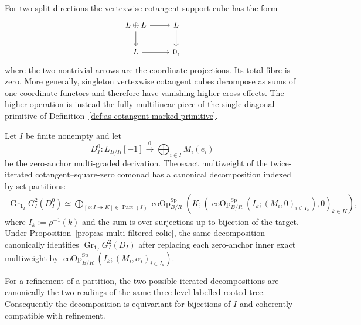 \begin{remark}
For two split directions the vertexwise cotangent support cube has the form
\[
\begin{tikzcd}
L\oplus L \arrow[r] \arrow[d] & L \arrow[d]\\
L \arrow[r] & 0,
\end{tikzcd}
\]
where the two nontrivial arrows are the coordinate projections.  Its total
fibre is zero.  More generally, singleton vertexwise cotangent cubes decompose
as sums of one-coordinate functors and therefore have vanishing higher
cross-effects.  The higher operation is instead the fully multilinear piece
of the single diagonal primitive of
Definition~\ref{def:as-cotangent-marked-primitive}.
\end{remark}

\begin{lemma}
\label{lem:as-two-level-partition-decomposition}
Let $I$ be finite nonempty and let
\[
    D_I^0:
    L_{B/R}[-1]
    \xrightarrow{0}
    \bigoplus_{i\in I}M_i(e_i)
\]
be the zero-anchor multi-graded derivation.  The exact multiweight of the
twice-iterated cotangent--square-zero comonad has a canonical decomposition
indexed by set partitions:
\[
\boxed{
\begin{aligned}
    \operatorname{Gr}_{\mathbf1_I}G_I^2(D_I^0)
    \simeq
    \bigoplus_{[\rho:I\twoheadrightarrow K]\in\operatorname{Part}(I)}
    \operatorname{coOp}^{\mathrm{Sp}}_{B/R}
    \left(
        K;
        \left(
            \operatorname{coOp}^{\mathrm{Sp}}_{B/R}
            (I_k;(M_i,0)_{i\in I_k}),0
        \right)_{k\in K}
    \right),
\end{aligned}}
\]
where $I_k:=\rho^{-1}(k)$ and the sum is over surjections up to bijection of
the target.  Under
Proposition~\ref{prop:as-multi-filtered-colie}, the same decomposition
canonically identifies
$\operatorname{Gr}_{\mathbf1_I}G_I^2(D_I)$ after replacing each zero-anchor
inner exact multiweight by
$\operatorname{coOp}^{\mathrm{Sp}}_{B/R}
(I_k;(M_i,\alpha_i)_{i\in I_k})$.

For a refinement of a partition, the two possible iterated decompositions are
canonically the two readings of the same three-level labelled rooted tree.
Consequently the decomposition is equivariant for bijections of $I$ and
coherently compatible with refinement.
\end{lemma}

